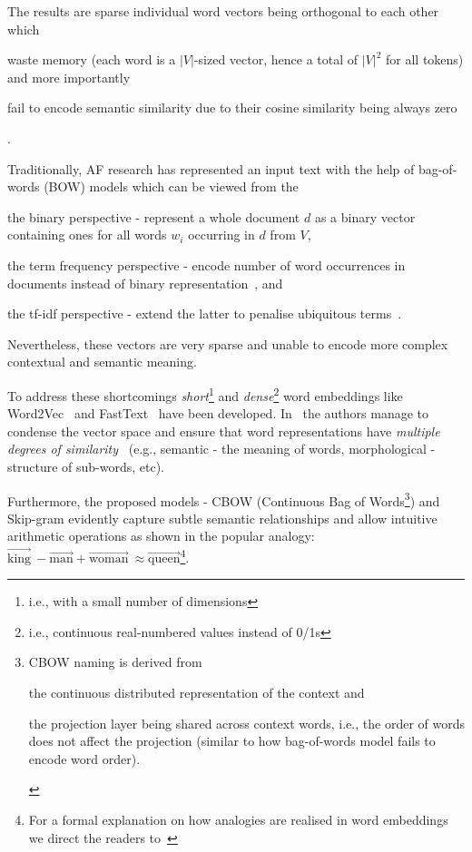 The results are sparse individual word vectors being orthogonal to each other which \begin{enumerate*}
    \item waste memory (each word is a $|V|$-sized vector, hence a total of $|V|^{2}$ for all tokens) and more importantly
    \item fail to encode semantic similarity due to their cosine similarity being always zero
\end{enumerate*}.


Traditionally, AF research has represented an input text with the help of bag-of-words (BOW) models which can be viewed from the  \begin{enumerate*}
    \item the binary perspective - represent a whole document $d$ as a binary vector containing ones for all words $w_{i}$ occurring in $d$ from $V$,
    \item the term frequency perspective - encode number of word occurrences in documents instead of binary representation~\cite{Xu2013AnAT}, and
    \item the tf-idf perspective - extend the latter to penalise ubiquitous terms~\cite{SprckJones1972ASI}.
\end{enumerate*}
Nevertheless, these vectors are very sparse and unable to encode more complex contextual and semantic meaning.

To address these shortcomings \emph{short}\footnote{i.e., with a small number of dimensions} and \emph{dense}\footnote{i.e., continuous real-numbered values instead of 0/1s} word embeddings like Word2Vec~\cite{mikolov2013efficient} and FastText~\cite{bojanowski-etal-2017-enriching} have been developed.
In~\cite{mikolov2013efficient} the authors manage to condense the vector space and ensure that word representations have \emph{multiple degrees of similarity}~\cite{mikolov-etal-2013-linguistic} (e.g., semantic - the meaning of words, morphological - structure of sub-words, etc).


Furthermore, the proposed models - CBOW (Continuous Bag of Words\footnote{
    CBOW naming is derived from \begin{enumerate*}
        \item the continuous distributed representation of the context and
        \item the projection layer being shared across context words, i.e., the order of words does not affect the projection (similar to how bag-of-words model fails to encode word order).
    \end{enumerate*}
}) and Skip-gram evidently capture subtle semantic relationships and allow intuitive arithmetic operations as shown in the popular analogy: $\overrightarrow{\text{king}}\ - \overrightarrow{\text{man}} +\overrightarrow{\text{woman}}\ \approx \overrightarrow{\text{queen}}$\footnote{
    For a formal explanation on how analogies are realised in word embeddings we direct the readers to~\cite{ethayarajh-etal-2019-towards}
}.


